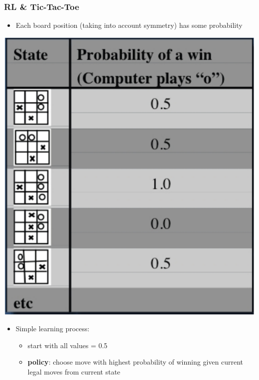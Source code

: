 \documentclass[handout]{beamer}
\renewcommand{\high}{\textbf}
\begin{document}
\begin{frame}\frametitle{RL \& Tic-Tac-Toe}\small
\begin{itemize}
\item Each board position (taking into account symmetry) has some probability
\end{itemize}
\begin{minipage}{4cm}
\begin{center}
\includegraphics[width=1.0\linewidth]{Figures/tic_tac} 
\end{center}
\end{minipage}
\begin{minipage}{7cm}
\begin{itemize}
\item Simple learning process: 
\begin{itemize}
\item start with all values = 0.5
\item \high{policy}: choose move with highest probability of winning given current legal moves from current state

\end{itemize}
\end{itemize}
\end{minipage}
\end{frame}
\end{document}
